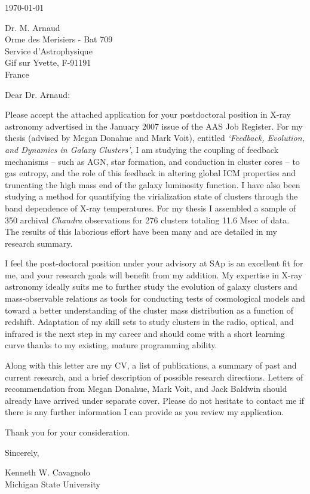 \documentclass[11pt]{article}
\begin{document}
\today

Dr. M. Arnaud\\
Orme des Merisiers - Bat 709\\
Service d'Astrophysique\\
Gif sur Yvette, F-91191\\
France

Dear Dr. Arnaud:

Please accept the attached application for your postdoctoral
position in X-ray astronomy advertised in the January 2007 issue
of the AAS Job Register. For my thesis (advised by Megan Donahue and
Mark Voit), entitled {\textit{`Feedback, Evolution, and Dynamics in
Galaxy Clusters'}}, I am studying the coupling of feedback mechanisms
-- such as AGN, star formation, and conduction in cluster cores -- to
gas entropy, and the role of this feedback in altering global ICM
properties and truncating the high mass end of the galaxy luminosity
function. I have also been studying a method for quantifying the
virialization state of clusters through the band dependence of X-ray
temperatures. For my thesis I assembled a sample of 350 archival
{\textit{Chandra}} observations for 276 clusters totaling 11.6 Msec of
data. The results of this laborious effort have been many and are
detailed in my research summary.

I feel the post-doctoral position under your advisory at
SAp is an excellent fit for me, and your research goals will benefit
from my addition. My expertise in X-ray astronomy ideally suits me to
further study the evolution of galaxy clusters and mass-observable
relations as tools for conducting tests of cosmological models and
toward a better understanding of the cluster mass distribution as a
function of redshift. Adaptation of my skill sets to study clusters in
the radio, optical, and infrared is the next step in my career and
should come with a short learning curve thanks to my existing, mature
programming ability.

Along with this letter are my CV, a list of publications, a summary of
past and current research, and a brief description of possible research
directions. Letters of recommendation from Megan Donahue, Mark Voit,
and Jack Baldwin should already have arrived under separate
cover. Please do not hesitate to contact me if there is any further
information I can provide as you review my application.

Thank you for your consideration.

Sincerely,\\
\begin{minipage}{7.5in}
\end{minipage}
Kenneth W. Cavagnolo\\
Michigan State University
\end{document}
